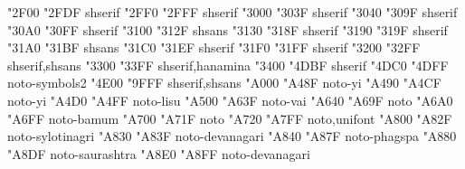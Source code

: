 \documentclass{article}
\begin{document}
                                    {  "2F00} {  "2FDF} {shserif}
                 {  "2FF0} {  "2FFF} {shserif}
                        {  "3000} {  "303F} {shserif}
                                           {  "3040} {  "309F} {shserif}
                                           {  "30A0} {  "30FF} {shserif}
                                           {  "3100} {  "312F} {shsans}
                          {  "3130} {  "318F} {shserif}
                                             {  "3190} {  "319F} {shserif}
                                  {  "31A0} {  "31BF} {shsans}
                                        {  "31C0} {  "31EF} {shserif}
                       {  "31F0} {  "31FF} {shserif}
                    {  "3200} {  "32FF} {shserif,shsans}
                                  {  "3300} {  "33FF} {shserif,hanamina}
                 {  "3400} {  "4DBF} {shserif}
                            {  "4DC0} {  "4DFF} {noto-symbols2}
                             {  "4E00} {  "9FFF} {shserif,shsans}
                                       {  "A000} {  "A48F} {noto-yi}
                                        {  "A490} {  "A4CF} {noto-yi}
                                               {  "A4D0} {  "A4FF} {noto-lisu}
                                                {  "A500} {  "A63F} {noto-vai}
                                {  "A640} {  "A69F} {noto}
                                              {  "A6A0} {  "A6FF} {noto-bamum}
                              {  "A700} {  "A71F} {noto}
                                   {  "A720} {  "A7FF} {noto,unifont}
                                       {  "A800} {  "A82F} {noto-sylotinagri}
                          {  "A830} {  "A83F} {noto-devanagari}
                                           {  "A840} {  "A87F} {noto-phagspa}
                                         {  "A880} {  "A8DF} {noto-saurashtra}
                                {  "A8E0} {  "A8FF} {noto-devanagari}
\end{document}
